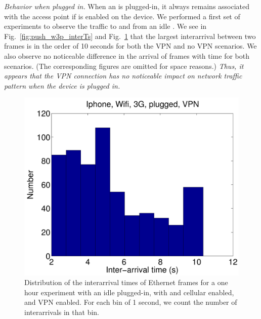 \noindent\emph{Behavior when plugged in.} When an \iphone{} is plugged-in, it always remains associated with the
\wifi{} access point if \wifi{} is enabled on the device. We performed
a first set of experiments to observe the traffic to and from an idle
\iphone{}. We see in Fig.~\ref{fig:push_w3p_interTs} and
Fig.~\ref{fig:push_w3pv_interTs} that the largest interarrival between
two frames is in the order of 10 seconds for both the VPN and no VPN
scenarios. We also observe no noticeable difference in the arrival of
frames with time for both scenarios. (The corresponding figures are 
omitted for space reasons.)
\emph{Thus, it appears that the VPN connection has no noticeable
  impact on network traffic pattern when the device is plugged in.}


\begin{figure}[t]
\centering
        \includegraphics[width=0.8\linewidth]{../../code/pushNotification/Fig/bw_iphone_wifi_3g_plug_vpn_interTs.pdf}
  \caption{Distribution of the interarrival times of Ethernet frames
    for a one hour experiment with an idle \iphone{} plugged-in, with \wifi{} and cellular
    enabled, and VPN enabled. For each bin of 1 second, we count
    the number of interarrivals in that bin.}
  \label{fig:push_w3pv_interTs}
   \vspace{\postfigspace}
\end{figure}



